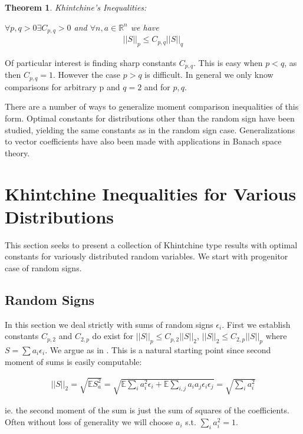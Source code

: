 \documentclass[10pt]{article}
\newcommand{\E}{\mathbb{E}}
\newcommand{\1}{\textbf{1}}
\newcommand{\R}{\mathbb{R}}
\newcommand{\norm}[1]{||#1||}
\newtheorem{theorem}{Theorem}
\theoremstyle{remark}
\theoremstyle{definition}
\begin{document}
\begin{theorem}Khintchine's Inequalities:

	$\forall p,q > 0 \exists C_{p,q} > 0$ and $\forall n, a \in \R^n$ we have
	\begin{align*}
		||S||_p \leq C_{p,q} ||S||_q
	\end{align*}
\end{theorem}


Of particular interest is finding sharp constants $C_{p,q}$. This is easy when $p < q$, as then $C_{p,q} = 1$. However the case $p > q$ is difficult. In general we only know comparisons for arbitrary p and $q=2$ and for $p,q$. 

There are a number of ways to generalize moment comparison inequalities of this form. Optimal constants for distributions other than the random sign have been studied, yielding the same constants as in the random sign case. Generalizations to vector coefficients have also been made with applications in Banach space theory.

\section{Khintchine Inequalities for Various Distributions}

This section seeks to present a collection of Khintchine type results with optimal constants for variously distributed random variables. We start with progenitor case of random signs.

\subsection{Random Signs}

In this section we deal strictly with sums of random signs $\epsilon_i$. First we establish constants $C_{p,2}$ and $C_{2,p}$ do exist for $||S||_p \leq C_{p,2} ||S||_2$, $ ||S||_2 \leq C_{2,p}||S||_p$ where $S = \sum a_i \epsilon_i$. We argue as in \cite{LT}. This is a natural starting point since second moment of sums is easily computable:

\begin{align*}
	\norm{S}_2 = \sqrt{\E S_a^2} = \sqrt{\E\sum_i a_i^2 \epsilon_i + \E\sum_{i,j}a_ia_j \epsilon_i\epsilon_j} = \sqrt{\sum_i a_i^2}
\end{align*}

ie. the second moment of the sum is just the sum of squares of the coefficients. Often without loss of generality we will choose $a_i$ s.t. $\sum_i a_i^2 = 1$.  
\end{document}
